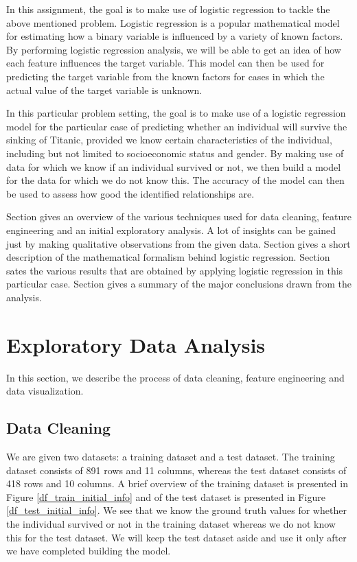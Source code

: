 \documentclass[conference]{IEEEtran}
\newcommand{\rom}[1]{\uppercase\expandafter{\romannumeral #1\relax}}
\begin{document}
In this assignment, the goal is to make use of logistic regression to tackle the above mentioned problem. Logistic regression is a popular mathematical model for estimating how a binary variable is influenced by a variety of known factors. By performing logistic regression analysis, we will be able to get an idea of how each feature influences the target variable. This model can then be used for predicting the target variable from the known factors for cases in which the actual value of the target variable is unknown.

In this particular problem setting, the goal is to make use of a logistic regression model for the particular case of predicting whether an individual will survive the sinking of Titanic, provided we know certain characteristics of the individual, including but not limited to socioeconomic status and gender. By making use of data for which we know if an individual survived or not, we then build a model for the data for which we do not know this. The accuracy of the model can then be used to assess how good the identified relationships are.

Section \rom{2} gives an overview of the various techniques used for data cleaning, feature engineering and an initial exploratory analysis. A lot of insights can be gained just by making qualitative observations from the given data. Section \rom{3} gives a short description of the mathematical formalism behind logistic regression. Section \rom{4} sates the various results that are obtained by applying logistic regression in this particular case. Section \rom{5} gives a summary of the major conclusions drawn from the analysis.


\section{Exploratory Data Analysis}

In this section, we describe the process of data cleaning, feature engineering and data visualization.

\subsection{Data Cleaning}

We are given two datasets: a training dataset and a test dataset. The training dataset consists of 891 rows and 11 columns, whereas the test dataset consists of 418 rows and 10 columns. A brief overview of the training dataset is presented in Figure \ref{df_train_initial_info} and of the test dataset is presented in Figure \ref{df_test_initial_info}. We see that we know the ground truth values for whether the individual survived or not in the training dataset whereas we do not know this for the test dataset. We will keep the test dataset aside and use it only after we have completed building the model.
\end{document}
